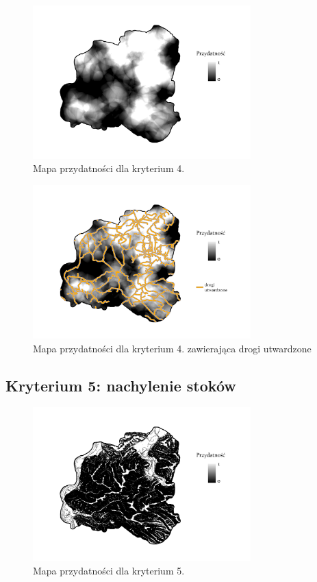 \documentclass{article}
\begin{document}
\begin{figure}[H]
    \centering
    \includegraphics[width=0.75\textwidth]{img/plesna-kryterium4-layout.jpg}
    \caption*{Mapa przydatności dla kryterium 4.}
\end{figure}

\begin{figure}[H]
    \centering
    \includegraphics[width=0.75\textwidth]{img/plesna-kryterium4-drogi.jpg}
    \caption*{Mapa przydatności dla kryterium 4. zawierająca drogi utwardzone}
\end{figure}

\subsection{Kryterium 5: nachylenie stoków}

\begin{figure}[H]
    \centering
    \includegraphics[width=0.75\textwidth]{img/plesna-kryterium5-layout.jpg}
    \caption*{Mapa przydatności dla kryterium 5.}
\end{figure}
\end{document}
